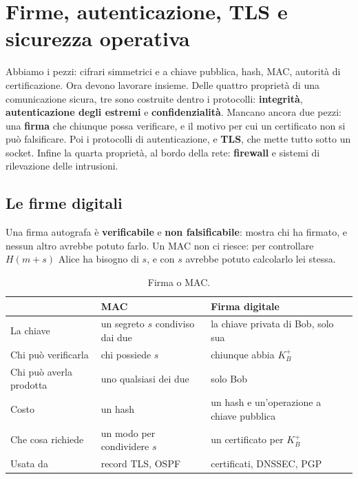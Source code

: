 \chapter{Firme, autenticazione, TLS e sicurezza operativa}

Abbiamo i pezzi: cifrari simmetrici e a chiave pubblica, hash, MAC, autorità di certificazione. Ora devono lavorare insieme. Delle
quattro proprietà di una comunicazione sicura, tre sono costruite dentro i protocolli: \textbf{integrità}, \textbf{autenticazione degli
estremi} e \textbf{confidenzialità}. Mancano ancora due pezzi: una \textbf{firma} che chiunque possa verificare, e il motivo per cui un
certificato non si può falsificare. Poi i protocolli di autenticazione, e \textbf{TLS}, che mette tutto sotto un socket. Infine la quarta
proprietà, al bordo della rete: \textbf{firewall} e sistemi di rilevazione delle intrusioni.

\section{Le firme digitali}

Una firma autografa è \textbf{verificabile} e \textbf{non falsificabile}: mostra chi ha firmato, e nessun altro avrebbe potuto farlo.
Un MAC non ci riesce: per controllare $H(m + s)$ Alice ha bisogno di $s$, e con $s$ avrebbe potuto calcolarlo lei stessa.


\begin{table}[H]
\centering
\begin{tabular}{lll}
\toprule
 & \textbf{MAC} & \textbf{Firma digitale} \\
\midrule
La chiave & un segreto $s$ condiviso dai due & la chiave privata di Bob, solo sua \\
Chi può verificarla & chi possiede $s$ & chiunque abbia $K_B^+$ \\
Chi può averla prodotta & uno qualsiasi dei due & solo Bob \\
Costo & un hash & un hash e un'operazione a chiave pubblica \\
Che cosa richiede & un modo per condividere $s$ & un certificato per $K_B^+$ \\
Usata da & record TLS, OSPF & certificati, DNSSEC, PGP \\
\bottomrule
\end{tabular}
\caption{Firma o MAC.}
\end{table}

